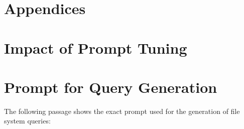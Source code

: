 






\onecolumn
\section*{Appendices}
\appendix

\section{Impact of Prompt Tuning}
\label{appendix:impact_of_prompt_tuning}


\section{Prompt for Query Generation}
\label{appendix:prompt_for_query_generation}
The following passage shows the exact prompt used for the generation of file system queries: 

